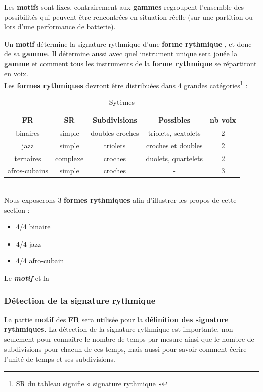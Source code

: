 Les \textbf{motifs} sont fixes, contrairement aux \textbf{gammes} regroupent
l’ensemble des possibilités qui peuvent être rencontrées en situation réelle
(sur une partition ou lors d’une performance de batterie).

Un \textbf{motif} détermine la signature rythmique d’une
\textbf{forme rythmique} , et donc de sa \textbf{gamme}. Il détermine aussi
avec quel instrument unique sera jouée la \textbf{gamme} et comment tous les
instruments de la \textbf{forme rythmique} se répartiront en voix.\\




Les \textbf{formes rythmiques} devront être distribuées dans 4 grandes
catégories\footnote{SR du tableau signifie « signature rythmique »}
\cite{system_drums} :
\begin{table}[h]
\centering
\begin{tabular}{|c|c|c|c|c|} \hline
\textbf{FR} & SR & Subdivisions & Possibles & nb
voix \\ \hline
binaires & simple & doubles-croches & triolets, sextolets & 2 \\
jazz & simple & triolets & croches et doubles & 2 \\
ternaires & complexe & croches & duolets, quartelets & 2 \\
afros-cubains & simple & croches & - & 3 \\ \hline
\end{tabular}
\caption{Sytèmes}
\end{table}\\
Nous exposerons 3 \textbf{formes rythmiques} afin d’illustrer les propos de
cette section :
\begin{itemize}
	\item 4/4 binaire 
	\item 4/4 jazz
	\item 4/4 afro-cubain
\end{itemize}

Le \textit{\textbf{motif}} et la

\subsubsection{Détection de la signature rythmique}
La partie \textbf{motif} des \textbf{FR} sera utilisée pour la
\textbf{définition des signature rythmiques}. 
La détection de la signature rythmique est importante, 
non seulement pour connaître le nombre de temps par mesure ainsi que le nombre
de subdivisions pour chacun de ces temps, mais aussi pour savoir comment écrire
l’unité de temps et ses subdivisions.

